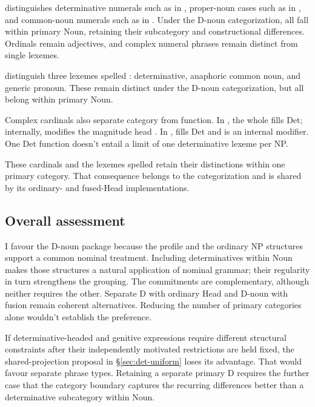 \documentclass[12pt]{article}
\begin{document}
\textcite{reynolds2026numerals} distinguishes determinative numerals such as  in , proper-noun cases such as  in , and common-noun numerals such as  in . Under the D-noun categorization, all fall within primary Noun, retaining their subcategory and constructional differences. Ordinals remain adjectives, and complex numeral phrases remain distinct from single lexemes.

\textcite[797--798]{payne2013anaphoric} distinguish three lexemes spelled : determinative, anaphoric common noun, and generic pronoun. These remain distinct under the D-noun categorization, but all belong within primary Noun.

Complex cardinals also separate category from function. In , the whole  fills Det; internally,  modifies the magnitude head  \citep[§4]{reynolds2026numerals}. In ,  fills Det and  is an internal modifier. One Det function doesn't entail a limit of one determinative lexeme per NP.

These cardinals and the lexemes spelled  retain their distinctions within one primary category. That consequence belongs to the categorization and is shared by its ordinary- and fused-Head implementations.

\subsection{Overall assessment}\label{sec:overall-assessment}

I favour the D-noun package because the profile and the ordinary NP structures support a common nominal treatment. Including determinatives within Noun makes those structures a natural application of nominal grammar; their regularity in turn strengthens the grouping. The commitments are complementary, although neither requires the other. Separate D with ordinary Head and D-noun with fusion remain coherent alternatives. Reducing the number of primary categories alone wouldn't establish the preference.

If determinative-headed and genitive expressions require different structural constraints after their independently motivated restrictions are held fixed, the shared-projection proposal in §\ref{sec:det-uniform} loses its advantage. That would favour separate phrase types. Retaining a separate primary D requires the further case that the category boundary captures the recurring differences better than a determinative subcategory within Noun.
\end{document}
